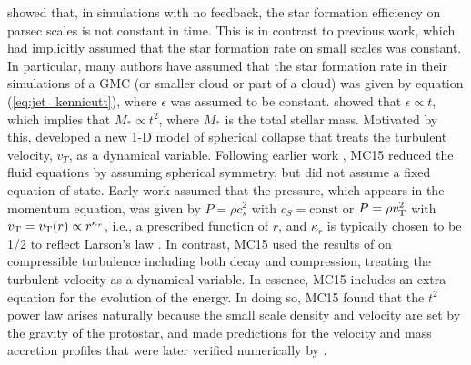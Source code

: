 \documentclass[../dissertation.tex]{subfiles}
\begin{document}

\citet{2015ApJ...800...49L} showed that, in simulations with no feedback, the star formation efficiency on
parsec scales is not constant in time.
This is in contrast to previous work, which had implicitly assumed that the star formation rate on small scales was constant.
In particular, many authors have assumed that the star formation rate in their simulations of a GMC (or smaller cloud or part of a cloud) was given by equation (\ref{eq:jet_kennicutt}), where $\epsilon$ was assumed to be constant.
\citet{2015ApJ...800...49L} showed that $\epsilon \propto t$, which implies that $M_* \propto t^2$, where $M_*$ is the total stellar mass.
Motivated by this, \citet[][hereafter MC15]{2015ApJ...804...44M} developed a new 1-D model of spherical collapse that treats the turbulent velocity, $v_T$, as a dynamical variable.
%
Following earlier work \citep{1977ApJ...214..488S,1992ApJ...396..631M,1997ApJ...476..750M}, MC15 reduced the fluid equations by assuming spherical symmetry, but did not assume a fixed equation of state.
Early work \citep{1977ApJ...214..488S,1992ApJ...396..631M,1997ApJ...476..750M} assumed that the pressure, which appears in the momentum equation, was given by $P = \rho c_s^2$ with $c_S = \textrm{const}$ or $P = \rho v_{\rm T}^2$ with $v_{\rm T} = v_{\rm T}(r) \propto r^{\kappa_r}$, i.e., a prescribed function of $r$, and $\kappa_r$ is typically chosen to be 1/2 to reflect Larson's law \citep{1981MNRAS.194..809L}.
In contrast,  MC15 used the results of \citet{2012ApJ...750L..31R} on compressible turbulence including both decay and compression, treating the turbulent velocity as a dynamical variable.  In essence, MC15 includes an extra equation for the evolution of the energy.
In doing so, MC15 found that the $t^2$ power law arises naturally because the small scale density and velocity are set by the gravity of the protostar, and made predictions for the velocity and mass accretion
profiles that were later verified numerically by \citet{2017MNRAS.465.1316M}.
\end{document}
